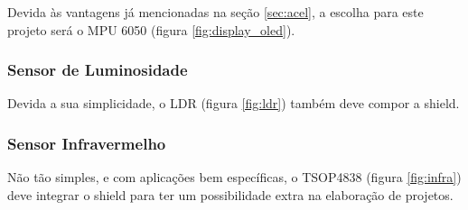 Devida às vantagens já mencionadas na seção \ref{sec:acel}, a escolha para este projeto será o MPU 6050 (figura \ref{fig:display_oled}).

\subsubsection*{Sensor de Luminosidade}

Devida a sua simplicidade, o LDR (figura \ref{fig:ldr}) também deve compor a shield.

\subsubsection*{Sensor Infravermelho}

Não tão simples, e com aplicações bem específicas, o TSOP4838 (figura \ref{fig:infra}) deve integrar o shield para ter um possibilidade extra na elaboração de projetos.


